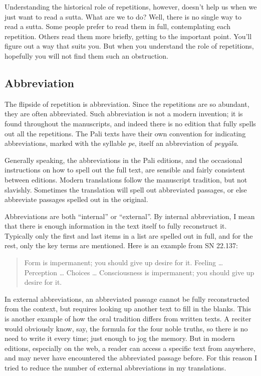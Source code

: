 \documentclass[12pt,openany]{book}%
\begin{document}
Understanding the historical role of repetitions, however, doesn’t help us when we just want to read a sutta. What are we to do? Well, there is no single way to read a sutta. Some people prefer to read them in full, contemplating each repetition. Others read them more briefly, getting to the important point. You’ll figure out a way that suits you. But when you understand the role of repetitions, hopefully you will not find them such an obstruction.

\subsection*{Abbreviation}

The flipside of repetition is abbreviation. Since the repetitions are so abundant, they are often abbreviated. Such abbreviation is not a modern invention; it is found throughout the manuscripts, and indeed there is no edition that fully spells out all the repetitions. The Pali texts have their own convention for indicating abbreviations, marked with the syllable \textit{pe}, itself an abbreviation of \textit{\textsanskrit{peyyāla}}.

Generally speaking, the abbreviations in the Pali editions, and the occasional instructions on how to spell out the full text, are sensible and fairly consistent between editions. Modern translations follow the manuscript tradition, but not slavishly. Sometimes the translation will spell out abbreviated passages, or else abbreviate passages spelled out in the original.

Abbreviations are both “internal” or “external”. By internal abbreviation, I mean that there is enough information in the text itself to fully reconstruct it. Typically only the first and last items in a list are spelled out in full, and for the rest, only the key terms are mentioned. Here is an example from SN 22.137:

\begin{quotation}%
Form is impermanent; you should give up desire for it. Feeling … Perception … Choices … Consciousness is impermanent; you should give up desire for it.

%
\end{quotation}

In external abbreviations, an abbreviated passage cannot be fully reconstructed from the context, but requires looking up another text to fill in the blanks. This is another example of how the oral tradition differs from written texts. A reciter would obviously know, say, the formula for the four noble truths, so there is no need to write it every time; just enough to jog the memory. But in modern editions, especially on the web, a reader can access a specific text from anywhere, and may never have encountered the abbreviated passage before. For this reason I tried to reduce the number of external abbreviations in my translations.
\end{document}
